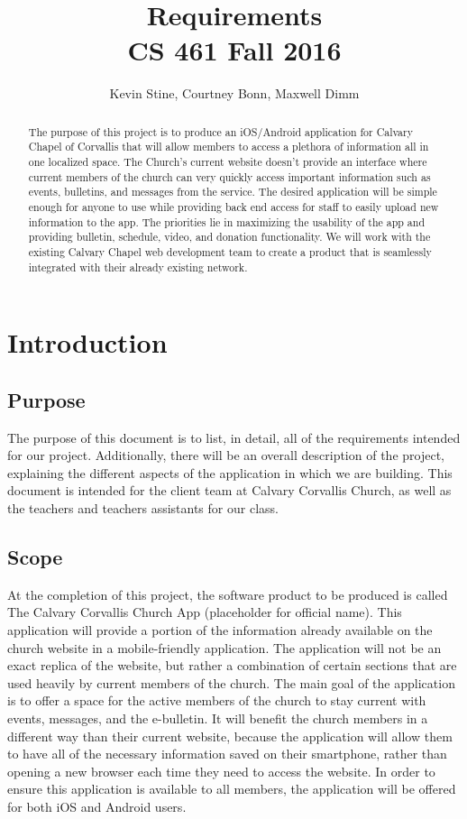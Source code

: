 \documentclass[letterpaper,10pt,draftclsnofoot,onecolumn,titlepage]{IEEEtran}
\def\name{Kevin Stine, Courtney Bonn, Maxwell Dimm}
\begin{document}
	\title{\huge Requirements \\ CS 461 Fall 2016}
	\author{\large \name}
	
	\maketitle
		\begin{abstract}The purpose of this project is to produce an iOS/Android application for Calvary Chapel of Corvallis that will allow members to access a plethora of information all in one localized space. 
		The Church's current website doesn't provide an interface where current members of the church can very quickly access important information such as events, bulletins, and messages from the service. 
		The desired application will be simple enough for anyone to use while providing back end access for staff to easily upload new information to the app. 
		The priorities lie in maximizing the usability of the app and providing bulletin, schedule, video, and donation functionality. 
		We will work with the existing Calvary Chapel web development team to create a product that is seamlessly integrated with their already existing network. 
		\end{abstract}
	
	\clearpage	
		
	\section{Introduction}
	\subsection{Purpose}
	The purpose of this document is to list, in detail, all of the requirements intended for our project. 
	Additionally, there will be an overall description of the project, explaining the different aspects of the application in which we are building. 
	This document is intended for the client team at Calvary Corvallis Church, as well as the teachers and teachers assistants for our class. 
	
	\subsection{Scope}
	At the completion of this project, the software product to be produced is called The Calvary Corvallis Church App (placeholder for official name). 
	This application will provide a portion of the information already available on the church website in a mobile-friendly application.
	The application will not be an exact replica of the website, but rather a combination of certain sections that are used heavily by current members of the church. 
	The main goal of the application is to offer a space for the active members of the church to stay current with events, messages, and the e-bulletin. 
	It will benefit the church members in a different way than their current website, because the application will allow them to have all of the necessary information saved on their smartphone, rather than opening a new browser each time they need to access the website. 
	In order to ensure this application is available to all members, the application will be offered for both iOS and Android users. 
	
\end{document}

